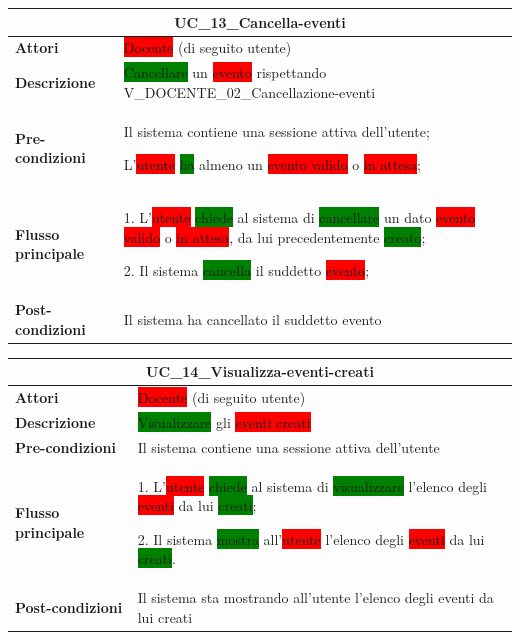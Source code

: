 \documentclass[11pt]{article}
\begin{document}
\begin{table}[H]
\centering
\begin{tabularx}{1\textwidth}{|l|X|}
\hline
\multicolumn{2}{|c|}{\textbf{UC\_13\_Cancella-eventi}}\\
\hline \textbf{Attori} & \colorbox{red}{Docente} (di seguito utente)\\
\hline \textbf{Descrizione} & \colorbox{green}{Cancellare} un \colorbox{red}{evento} rispettando V\_DOCENTE\_02\_Cancellazione-eventi\\
\hline \textbf{Pre-condizioni} &
Il sistema contiene una sessione attiva dell'utente;

L'\colorbox{red}{utente} \colorbox{green}{ha} almeno un \colorbox{red}{evento valido} o \colorbox{red}{in attesa}; 
\\
\hline \textbf{Flusso principale} &
1. L'\colorbox{red}{utente} \colorbox{green}{chiede} al sistema di \colorbox{green}{cancellare} un dato \colorbox{red}{evento valido} o \colorbox{red}{in attesa}, da lui precedentemente \colorbox{green}{creato}; 

2. Il sistema \colorbox{green}{cancella} il suddetto \colorbox{red}{evento};
\\
\hline \textbf{Post-condizioni} & Il sistema ha cancellato il suddetto evento\\
\hline
\end{tabularx}
\end{table}

\begin{table}[H]
\centering
\begin{tabularx}{1\textwidth}{|l|X|}
\hline
\multicolumn{2}{|c|}{\textbf{UC\_14\_Visualizza-eventi-creati}}\\
\hline \textbf{Attori} & \colorbox{red}{Docente} (di seguito utente)\\
\hline \textbf{Descrizione} & \colorbox{green}{Visualizzare} gli \colorbox{red}{eventi creati}\\
\hline \textbf{Pre-condizioni} & Il sistema contiene una sessione attiva dell'utente\\
\hline \textbf{Flusso principale} & 
1. L'\colorbox{red}{utente} \colorbox{green}{chiede} al sistema di \colorbox{green}{visualizzare} l'elenco degli \colorbox{red}{eventi} da lui \colorbox{green}{creati};

2. Il sistema \colorbox{green}{mostra} all'\colorbox{red}{utente} l'elenco degli \colorbox{red}{eventi} da lui \colorbox{green}{creati}.
\\
\hline \textbf{Post-condizioni} & Il sistema sta mostrando all'utente l'elenco degli eventi da lui creati\\
\hline
\end{tabularx}
\end{table}
\end{document}
